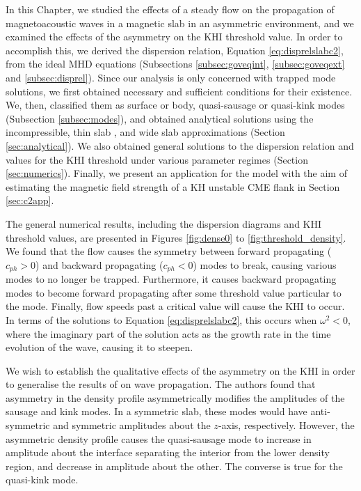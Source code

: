 \documentclass[12pt]{ociamthesis}
\begin{document}
In this Chapter, we studied the effects of a steady flow on the propagation of magnetoacoustic waves in a magnetic slab in an asymmetric environment, and we examined the effects of the asymmetry on the KHI threshold value.
In order to accomplish this, we derived the dispersion relation, Equation \eqref{eq:disprelslabc2}, from the ideal MHD equations (Subsections \ref{subsec:goveqint}, \ref{subsec:goveqext} and \ref{subsec:disprel}).
Since our analysis is only concerned with trapped mode solutions, we first obtained necessary and sufficient conditions for their existence.
We, then, classified them as surface or body, quasi-sausage or quasi-kink modes (Subsection \ref{subsec:modes}), and obtained analytical solutions using the incompressible, thin slab , and wide slab approximations (Section \ref{sec:analytical}).
We also obtained general solutions to the dispersion relation and values for the KHI threshold under various parameter regimes (Section \ref{sec:numerics}).
Finally, we present an application for the model with the aim of estimating the magnetic field strength of a KH unstable CME flank in Section \ref{sec:c2app}.

The general numerical results, including the dispersion diagrams and KHI threshold values, are presented in Figures \ref{fig:dense0} to \ref{fig:threshold_density}.
We found that the flow causes the symmetry between forward propagating ($c_{ph} > 0$) and backward propagating ($c_{ph} <0$) modes to break, causing various modes to no longer be trapped.
Furthermore, it causes backward propagating modes to become forward propagating after some threshold value particular to the mode.
Finally, flow speeds past a critical value will cause the KHI to occur.
In terms of the solutions to Equation \eqref{eq:disprelslabc2}, this occurs when $\omega^2 < 0$, where the imaginary part of the solution acts as the growth rate in the time evolution of the wave, causing it to steepen.

We wish to establish the qualitative effects of the asymmetry on the KHI in order to generalise the results of \cite{Allcock2017} on wave propagation.
The authors found that asymmetry in the density profile asymmetrically modifies the amplitudes of the sausage and kink modes.
In a symmetric slab, these modes would have anti-symmetric and symmetric amplitudes about the $z$-axis, respectively.
However, the asymmetric density profile causes the quasi-sausage mode to increase in amplitude about the interface separating the interior from the lower density region, and decrease in amplitude about the other.
The converse is true for the quasi-kink mode.
\end{document}
